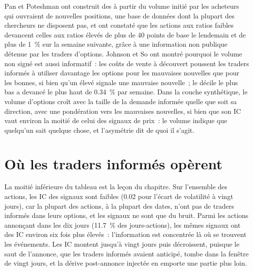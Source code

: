 Pan et Poteshman ont construit des  à partir du volume initié par les acheteurs qui ouvraient de nouvelles positions, une base de données dont la plupart des chercheurs ne disposent pas, et ont constaté que
les actions aux ratios faibles devancent celles aux ratios élevés de plus de 40 points de base le lendemain et de plus de 1~\% sur la semaine suivante, grâce à une information non
publique détenue par les traders d'options. Johnson et So ont montré pourquoi le volume non signé est aussi informatif~: les coûts de vente à découvert poussent les traders informés à utiliser davantage les options
pour les mauvaises nouvelles que pour les bonnes, si bien qu'un  élevé signale une mauvaise nouvelle~; le décile le plus bas a devancé le plus haut de 0.34~\% par semaine. Dans la couche
synthétique, le volume d'options croît avec la taille de la demande informée quelle que soit sa direction, avec une pondération vers les mauvaises nouvelles, si bien que son IC vaut environ la moitié de celui des signaux de
prix~: le volume indique que quelqu'un sait quelque chose, et l'asymétrie dit de quoi il s'agit.

\section{Où les traders informés opèrent}

La moitié inférieure du tableau est la leçon du chapitre. Sur l'ensemble des actions, les IC des signaux sont faibles (0.02 pour l'écart de volatilité à vingt jours), car la plupart
des actions, à la plupart des dates, n'ont pas de traders informés dans leurs options, et les signaux ne sont que du bruit. Parmi les actions annonçant dans les dix jours (11.7~\% des jours-actions), les
mêmes signaux ont des IC environ six fois plus élevés~: l'information est concentrée là où se trouvent les événements. Les IC montent jusqu'à vingt jours puis décroissent, puisque le
saut de l'annonce, que les traders informés avaient anticipé, tombe dans la fenêtre de vingt jours, et la dérive post-annonce injectée en emporte une partie
plus loin.


